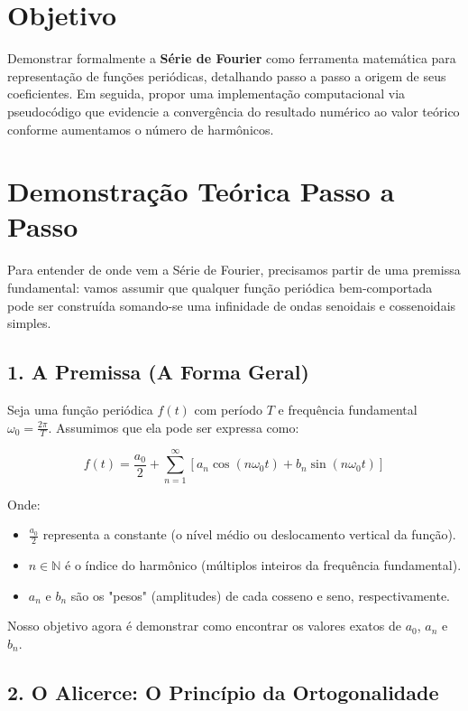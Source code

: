 \section*{Objetivo}

Demonstrar formalmente a \textbf{Série de Fourier} como ferramenta matemática para representação de funções periódicas, detalhando passo a passo a origem de seus coeficientes. Em seguida, propor uma implementação computacional via pseudocódigo que evidencie a convergência do resultado numérico ao valor teórico conforme aumentamos o número de harmônicos.

\section*{Demonstração Teórica Passo a Passo}

Para entender de onde vem a Série de Fourier, precisamos partir de uma premissa fundamental: vamos assumir que qualquer função periódica bem-comportada pode ser construída somando-se uma infinidade de ondas senoidais e cossenoidais simples.

\subsection*{1. A Premissa (A Forma Geral)}

Seja uma função periódica $f(t)$ com período $T$ e frequência fundamental $\omega_0 = \frac{2\pi}{T}$. Assumimos que ela pode ser expressa como:

\begin{equation}
f(t) = \frac{a_0}{2} + \sum_{n=1}^{\infty} \left[ a_n \cos(n\omega_0 t) + b_n \sin(n\omega_0 t) \right]
\label{eq:fourier_series}
\end{equation}

Onde:
\begin{itemize}
    \item $\frac{a_0}{2}$ representa a constante (o nível médio ou deslocamento vertical da função).
    \item $n \in \mathbb{N}$ é o índice do harmônico (múltiplos inteiros da frequência fundamental).
    \item $a_n$ e $b_n$ são os "pesos" (amplitudes) de cada cosseno e seno, respectivamente.
\end{itemize}

Nosso objetivo agora é demonstrar como encontrar os valores exatos de $a_0$, $a_n$ e $b_n$.

\subsection*{2. O Alicerce: O Princípio da Ortogonalidade}

